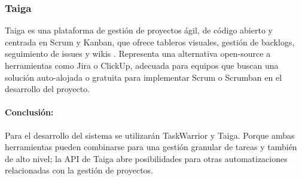 \subsubsection{Taiga}
Taiga es una plataforma de gestión de proyectos ágil, de código abierto y centrada en Scrum y Kanban, que ofrece tableros visuales, gestión de backlogs, seguimiento de issues y wikis \parencite{Taiga}.
Representa una alternativa open-source a herramientas como Jira o ClickUp, adecuada para equipos que buscan una solución auto-alojada o gratuita para implementar Scrum o Scrumban en el desarrollo del proyecto.

\paragraph{Conclusión:}
Para el desarrollo del sistema se utilizarán TaskWarrior y Taiga.
Porque ambas herramientas pueden combinarse para una gestión granular de tareas y también de alto nivel;
la API de Taiga abre posibilidades para otras automatizaciones relacionadas con la gestión de proyectos.
